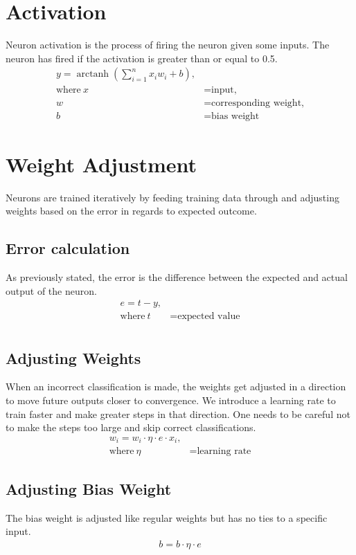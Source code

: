 \documentclass[a4paper,12pt]{book}
\DeclareMathOperator{\arctanh}{arctanh}
\begin{document}
\section{Activation}
\text Neuron activation is the process of firing the neuron given some inputs. The neuron has fired if the activation is greater than or equal to 0.5.
\begin{align*}
	y = \arctanh(\sum_{i=1}^{n}{x}_i{w}_i+{b}), \\
	\text{where}~x &= \text{input,} \\
	w &= \text{corresponding weight,} \\
	b &= \text{bias weight}
\end{align*}

\section{Weight Adjustment}
\text Neurons are trained iteratively by feeding training data through and adjusting weights based on the error in regards to expected outcome.

	\subsection{Error calculation}
	\text As previously stated, the error is the difference between the expected and actual output of the neuron.
	\begin{align*}
		{e} = t-y, \\
		\text{where}~t &= \text{expected value} \\
	\end{align*}

	\subsection{Adjusting Weights}
	\text When an incorrect classification is made, the weights get adjusted in a direction to move future outputs closer to convergence. We introduce a learning rate to train faster and make greater steps in that direction. One needs to be careful not to make the steps too large and skip correct classifications.
	\begin{align*}
		{w}_i = {w}_i\cdot\eta\cdot{e}\cdot{x}_i, \\
		\text{where}~\eta &= \text{learning rate}
	\end{align*}

	\subsection{Adjusting Bias Weight}
	\text The bias weight is adjusted like regular weights but has no ties to a specific input.
	\begin{align*}
		b = b\cdot\eta\cdot{e}
	\end{align*}
\end{document}
